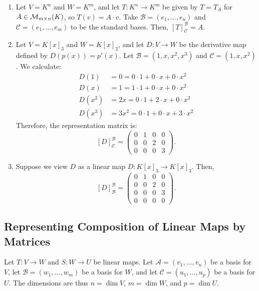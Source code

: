\begin{example}
\begin{enumerate}
    \item  Let $V = K^n$ and $W = K^m$, and let $T: K^n \to K^m$ be given by $T = T_A$ for $A \in \mathcal{M}_{m \times n}(K)$, so $T(v) = A \cdot v$. Take $\mathcal{B} = (e_1, \dots, e_n)$ and $\mathcal{C} = (e_1, \dots, e_m)$ to be the standard bases. Then, $[T]_{\mathcal{C}}^{\mathcal{B}} = A$.
    \item  Let $V = K[x]_3$ and $W = K[x]_2$, and let $D: V \to W$ be the derivative map defined by $D(p(x)) = p'(x)$. Let $\mathcal{B} = (1, x, x^2, x^3)$ and $\mathcal{C} = (1, x, x^2)$. We calculate:
    \begin{align*}
    D(1) &= 0 = 0 \cdot 1 + 0 \cdot x + 0 \cdot x^2 \\
    D(x) &= 1 = 1 \cdot 1 + 0 \cdot x + 0 \cdot x^2 \\
    D(x^2) &= 2x = 0 \cdot 1 + 2 \cdot x + 0 \cdot x^2 \\
    D(x^3) &= 3x^2 = 0 \cdot 1 + 0 \cdot x + 3 \cdot x^2
    \end{align*}
    Therefore, the representation matrix is:
    \[
    [D]_{\mathcal{C}}^{\mathcal{B}} = 
    \begin{pmatrix}
    0 & 1 & 0 & 0 \\
    0 & 0 & 2 & 0 \\
    0 & 0 & 0 & 3
    \end{pmatrix}.
    \]
    \setcounter{enumi}{1} %
    \item  Suppose we view $D$ as a linear map $D: K[x]_3 \to K[x]_3$. Then,
    \[
    [D]_{\mathcal{B}}^{\mathcal{B}} = 
    \begin{pmatrix}
    0 & 1 & 0 & 0 \\
    0 & 0 & 2 & 0 \\
    0 & 0 & 0 & 3 \\
    0 & 0 & 0 & 0
    \end{pmatrix}.
    \]
\end{enumerate}
\end{example}


\subsection{Representing Composition of Linear Maps by Matrices}

Let $T: V \to W$ and $S: W \to U$ be linear maps. Let $\mathcal{A} = (v_1, \dots, v_n)$ be a basis for $V$, let $\mathcal{B} = (w_1, \dots, w_m)$ be a basis for $W$, and let $\mathcal{C} = (u_1, \dots, u_p)$ be a basis for $U$. The dimensions are thus $n = \dim V$, $m = \dim W$, and $p = \dim U$.

